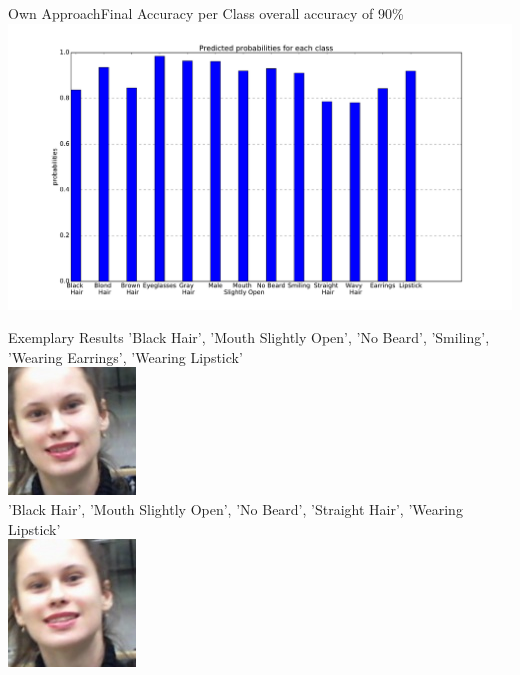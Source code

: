 \documentclass{beamer}
\begin{document}
\begin{frame}{Own Approach}{Final Accuracy per Class}
\centering
overall accuracy of 90\%
\centering
	\includegraphics[width=1.1\textwidth]{figures/accuracy_on_classes} 
\end{frame}

\begin{frame}{Exemplary Results}
\centering
'Black Hair', 'Mouth Slightly Open', 'No Beard', 'Smiling', 'Wearing Earrings', 'Wearing Lipstick' \\
\includegraphics[height=0.3\textheight]{figures/leti_normalised110} \\ 
'Black Hair', 'Mouth Slightly Open', 'No Beard', 'Straight Hair', 'Wearing Lipstick' \\
\centering
\includegraphics[height=0.3\textheight]{figures/leti_normalised111} 
\end{frame}
\end{document}
